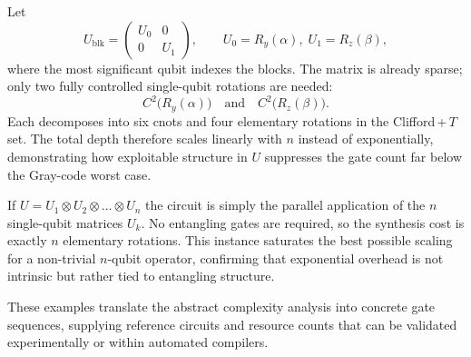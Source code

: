 \begin{example}
Let  
\[
U_{\mathrm{blk}}=
\begin{pmatrix}
U_{0} & 0 \\ 0 & U_{1}
\end{pmatrix},
\qquad
U_{0}=R_{y}(\alpha),\;
U_{1}=R_{z}(\beta),
\]
where the most significant qubit indexes the blocks. The matrix is already sparse; only two fully controlled single-qubit rotations are needed:
\[
C^{2}\bigl(R_{y}(\alpha)\bigr)\quad\text{and}\quad
C^{2}\bigl(R_{z}(\beta)\bigr).
\]
Each decomposes into six \gls{cnot}s and four elementary rotations in the Clifford\,+\,$T$ set. The total depth therefore scales linearly with $n$ instead of exponentially, demonstrating how exploitable structure in $U$ suppresses the gate count far below the Gray-code worst case.
\end{example}

\begin{example}
If $U=U_{1}\otimes U_{2}\otimes\dots\otimes U_{n}$ the circuit is simply the parallel application of the $n$ single-qubit matrices $U_{k}$. No entangling gates are required, so the synthesis cost is exactly $n$ elementary rotations. This instance saturates the best possible scaling for a non-trivial $n$-qubit operator, confirming that exponential overhead is not intrinsic but rather tied to entangling structure.
\end{example}

These examples translate the abstract complexity analysis into concrete gate sequences, supplying reference circuits and resource counts that can be validated experimentally or within automated compilers.


